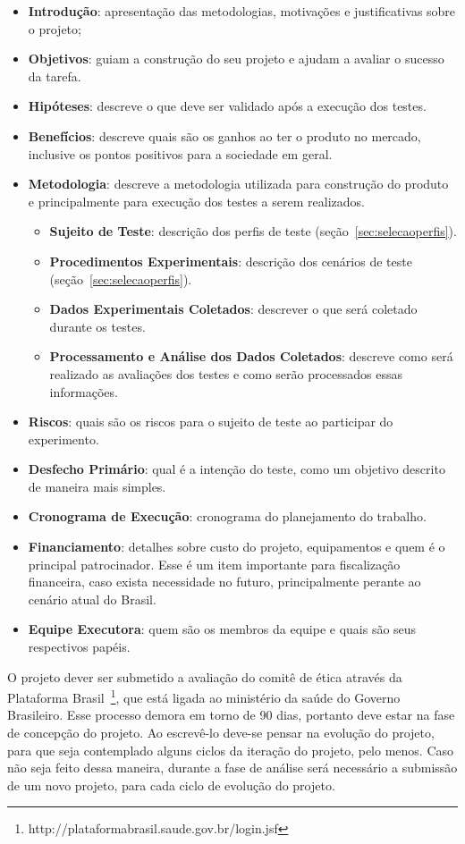 \begin{itemize}
	\item \textbf{Introdução}: apresentação das metodologias, motivações e justificativas sobre o projeto;
	\item \textbf{Objetivos}: guiam a construção do seu projeto e ajudam a avaliar o sucesso da tarefa.
	\item \textbf{Hipóteses}: descreve o que deve ser validado após a execução dos testes.
	\item \textbf{Benefícios}: descreve quais são os ganhos ao ter o produto no mercado, inclusive os pontos positivos para a sociedade em geral.
	\item \textbf{Metodologia}: descreve a metodologia utilizada para construção do produto e principalmente para execução dos testes a serem realizados.
	\begin{itemize}
		\item \textbf{Sujeito de Teste}: descrição dos perfis de teste (seção~\ref{sec:selecaoperfis}).
		\item \textbf{Procedimentos Experimentais}: descrição dos cenários de teste (seção~\ref{sec:selecaoperfis}).
		\item \textbf{Dados Experimentais Coletados}: descrever o que será coletado durante os testes.
		\item \textbf{Processamento e Análise dos Dados Coletados}: descreve como será realizado as avaliações dos testes e como serão processados essas informações.
	\end{itemize}
	\item \textbf{Riscos}: quais são os riscos para o sujeito de teste ao participar do experimento.
	\item \textbf{Desfecho Primário}: qual é a intenção do teste, como um objetivo descrito de maneira mais simples.
	\item \textbf{Cronograma de Execução}: cronograma do planejamento do trabalho.
	\item \textbf{Financiamento}: detalhes sobre custo do projeto, equipamentos e quem é o principal patrocinador. Esse é um item importante para fiscalização financeira, caso exista necessidade no futuro, principalmente perante ao cenário atual do Brasil.
	\item \textbf{Equipe Executora}: quem são os membros da equipe e quais são seus respectivos papéis.
\end{itemize}

O projeto dever ser submetido a avaliação do comitê de ética através da Plataforma Brasil~\footnote{http://plataformabrasil.saude.gov.br/login.jsf}, que está ligada ao ministério da saúde do Governo Brasileiro. Esse processo demora em torno de 90 dias, portanto deve estar na fase de concepção do projeto. Ao escrevê-lo deve-se pensar na evolução do projeto, para que seja contemplado alguns ciclos da iteração do projeto, pelo menos. Caso não seja feito dessa maneira, durante a fase de análise será necessário a submissão de um novo projeto, para cada ciclo de evolução do projeto.

